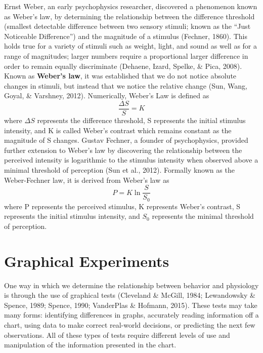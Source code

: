 \documentclass[print]{nuthesis}
\begin{document}
Ernst Weber, an early psychophysics researcher, discovered a phenomenon known as Weber's law, by determining the relationship between the difference threshold (smallest detectable difference between two sensory stimuli; known as the ``Just Noticeable Difference'') and the magnitude of a stimulus (Fechner, 1860).
This holds true for a variety of stimuli such as weight, light, and sound as well as for a range of magnitudes; larger numbers require a proportional larger difference in order to remain equally discriminate (Dehaene, Izard, Spelke, \& Pica, 2008).
Known as \textbf{Weber's law}, it was established that we do not notice absolute changes in stimuli, but instead that we notice the relative change (Sun, Wang, Goyal, \& Varshney, 2012).
Numerically, Weber's Law is defined as
\begin{equation}
\frac{\Delta S}{S} = K
\end{equation}
where \(\Delta S\) represents the difference threshold, S represents the initial stimulus intensity, and K is called Weber's contrast which remains constant as the magnitude of S changes.
Gustav Fechner, a founder of psychophysics, provided further extension to Weber's law by discovering the relationship between the perceived intensity is logarithmic to the stimulus intensity when observed above a minimal threshold of perception (Sun et al., 2012).
Formally known as the Weber-Fechner law, it is derived from Weber's law as
\begin{equation}
P = K\ln \frac{S}{S_0}
\end{equation}
where P represents the perceived stimulus, K represents Weber's contrast, S represents the initial stimulus intensity, and \(S_0\) represents the minimal threshold of perception.

\hypertarget{graphical-experiments}{%
\section{Graphical Experiments}\label{graphical-experiments}}

One way in which we determine the relationship between behavior and physiology is through the use of graphical tests (Cleveland \& McGill, 1984; Lewandowsky \& Spence, 1989; Spence, 1990; VanderPlas \& Hofmann, 2015).
These tests may take many forms: identifying differences in graphs, accurately reading information off a chart, using data to make correct real-world decisions, or predicting the next few observations.
All of these types of tests require different levels of use and manipulation of the information presented in the chart.
\end{document}
